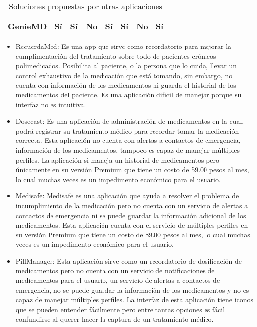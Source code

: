 \begin{table}[H]
{\begin{tabular}{|l|c|c|c|c|c|c|c|}
		GenieMD                          & Sí              & Sí                                                                         & No                                                                            & Sí                                                                      & Sí                                                           & No                                                                    & Sí                                                                 \\ \hline
	\end{tabular}
	}
\caption{Soluciones propuestas por otras aplicaciones}
\label{SolucionesProp}
\end{table}

\begin{itemize}
	\item RecuerdaMed: Es una app que sirve como recordatorio para mejorar la cumplimentación del tratamiento sobre todo de pacientes crónicos polimedicados. Posibilita al paciente, o la persona que lo cuida, llevar un control exhaustivo de la medicación que está tomando, sin embargo, no cuenta con información de los medicamentos ni guarda el historial de los medicamentos del paciente. Es una aplicación difícil de manejar porque su interfaz no es intuitiva.

	\item Dosecast: Es una aplicación de administración de medicamentos en la cual, podrá registrar su tratamiento médico para recordar tomar la medicación correcta. Esta aplicación no cuenta con alertas a contactos de emergencia, información de los medicamentos, tampoco es capaz de manejar múltiples perfiles. La aplicación si maneja un historial de medicamentos pero únicamente en su versión Premium que tiene un costo de 59.00 pesos al mes, lo cual muchas veces es un impedimento económico para el usuario.

	\item Medisafe: Medisafe es una aplicación que ayuda a resolver el problema de incumplimiento de la medicación pero no cuenta con un servicio de alertas a contactos de emergencia ni se puede guardar la información adicional de los medicamentos. Esta aplicación cuenta con el servicio de múltiples perfiles en su versión Premium que tiene un costo de 89.00 pesos al mes, lo cual muchas veces es un impedimento económico para el usuario.
	
	\item PillManager: Esta aplicación sirve como un recordatorio de dosificación de medicamentos pero no cuenta con un servicio de notificaciones de medicamentos para el usuario, un servicio de alertas a contactos de emergencia, no se puede guardar la información de los medicamentos y no es capaz de manejar múltiples perfiles. La interfaz de esta aplicación tiene iconos que se pueden entender fácilmente pero entre tantas opciones es fácil confundirse al querer hacer la captura de un tratamiento médico.


\end{itemize}
